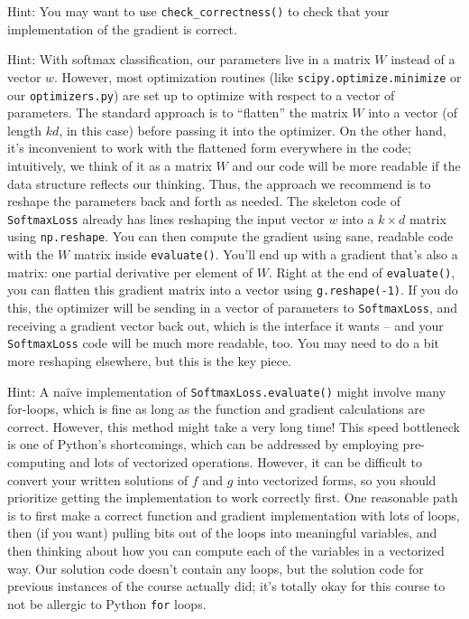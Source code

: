 \documentclass{article}
\begin{document}
Hint: You may want to use \verb|check_correctness()| to check that your implementation of the gradient is correct.

Hint: With softmax classification, our parameters live in a matrix $W$ instead of a vector $w$. However, most optimization routines (like \verb|scipy.optimize.minimize| or our \verb|optimizers.py|) are set up to optimize with respect to a vector of parameters. The standard approach is to ``flatten'' the matrix $W$ into a vector (of length $kd$, in this case) before passing it into the optimizer. On the other hand, it's inconvenient to work with the flattened form everywhere in the code; intuitively, we think of it as a matrix $W$ and our code will be more readable if the data structure reflects our thinking. Thus, the approach we recommend is to reshape the parameters back and forth as needed. The skeleton code of \verb|SoftmaxLoss| already has lines reshaping the input vector $w$ into a $k \times d$ matrix using \verb|np.reshape|. You can then compute the gradient using sane, readable code with the $W$ matrix inside \verb|evaluate()|. You'll end up with a gradient that's also a matrix: one partial derivative per element of $W$. Right at the end of \verb|evaluate()|, you can flatten this gradient matrix into a vector using \verb|g.reshape(-1)|. If you do this, the optimizer will be sending in a vector of parameters to \verb|SoftmaxLoss|, and receiving a gradient vector back out, which is the interface it wants -- and your \verb|SoftmaxLoss| code will be much more readable, too. You may need to do a bit more reshaping elsewhere, but this is the key piece.

Hint: A na\"ive implementation of \verb|SoftmaxLoss.evaluate()| might involve many for-loops, which is fine as long as the function and gradient calculations are correct. However, this method might take a very long time! This speed bottleneck is one of Python's shortcomings, which can be addressed by employing pre-computing and lots of vectorized operations. However, it can be difficult to convert your written solutions of $f$ and $g$ into vectorized forms, so you should prioritize getting the implementation to work correctly first. One reasonable path is to first make a correct function and gradient implementation with lots of loops, then (if you want) pulling bits out of the loops into meaningful variables, and then thinking about how you can compute each of the variables in a vectorized way. Our solution code doesn't contain any loops, but the solution code for previous instances of the course actually did; it's totally okay for this course to not be allergic to Python \verb|for| loops.
\end{document}
